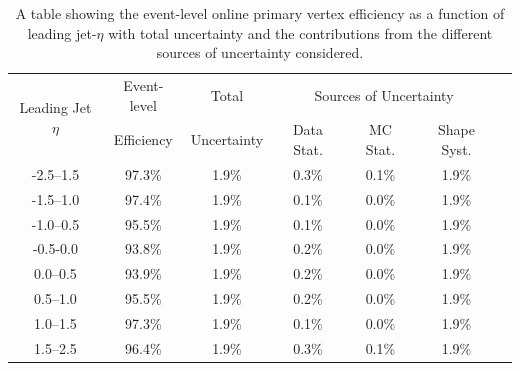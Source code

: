 \begin{table}[!ht]
  \begin{center}
  \begin{tabular}{|c||c|c||c|c|c||c|}
    \hline
\multirow{2}{*}{Leading Jet $\eta$} & Event-level  & Total       & \multicolumn{3}{c|}{Sources of Uncertainty} \\ \cline{4-6} 
                                    & Efficiency   & Uncertainty & Data Stat. & MC Stat. & Shape Syst. \\
\hline
-2.5--1.5 & 97.3\% & 1.9\% & 0.3\% & 0.1\% & 1.9\%  \\
-1.5--1.0 & 97.4\% & 1.9\% & 0.1\% & 0.0\% & 1.9\%  \\
-1.0--0.5 & 95.5\% & 1.9\% & 0.1\% & 0.0\% & 1.9\%  \\
-0.5-0.0  & 93.8\% & 1.9\% & 0.2\% & 0.0\% & 1.9\%  \\
0.0--0.5  & 93.9\% & 1.9\% & 0.2\% & 0.0\% & 1.9\%  \\
0.5--1.0  & 95.5\% & 1.9\% & 0.2\% & 0.0\% & 1.9\%  \\
1.0--1.5  & 97.3\% & 1.9\% & 0.1\% & 0.0\% & 1.9\%  \\
1.5--2.5  & 96.4\% & 1.9\% & 0.3\% & 0.1\% & 1.9\%  \\
\hline
\end{tabular}
  \caption{\label{tab:bTrig_eventEff} A table showing the event-level online primary vertex efficiency as a function of leading jet-$\eta$
    with total uncertainty and the contributions from the different sources of uncertainty considered.}    
  \end{center}
\end{table}

